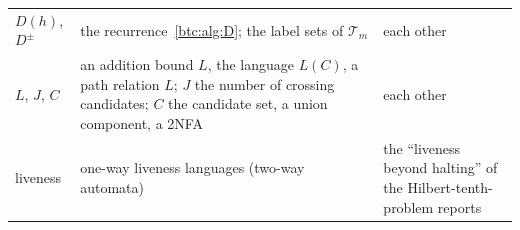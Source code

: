 \begin{minipage}{\textwidth}
\begin{tabular}{@{}>{\raggedright\arraybackslash}p{0.75in}>{\raggedright\arraybackslash}p{3.55in}>{\raggedright\arraybackslash}p{1.85in}@{}}
$D(h)$, $D^\pm$ & the recurrence~\eqref{btc:alg:D}; the label sets of $\mathcal T_m$ & each other\\
$L$, $J$, $C$ & an addition bound $L$, the language $L(C)$, a path relation $L$; $J$ the number of crossing candidates; $C$ the candidate set, a union component, a 2NFA & each other\\
liveness & one-way liveness languages (two-way automata) & the ``liveness beyond halting'' of the Hilbert-tenth-problem reports\\
\bottomrule
\end{tabular}
\endgroup
\end{minipage}%
\par
